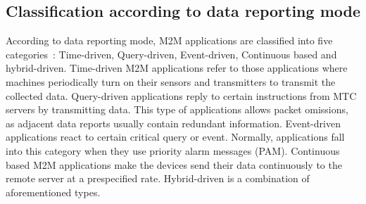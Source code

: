\subsection{Classification according to data reporting mode}
According to data reporting mode, M2M applications are classified into five categories~\cite{al2004routing}\cite{Costa14}\cite{borges2014survey}: Time-driven, Query-driven, Event-driven, Continuous based and hybrid-driven. Time-driven M2M applications refer to those applications where machines periodically turn on their sensors and transmitters to transmit the collected data. Query-driven applications reply to
certain instructions from MTC servers by transmitting data. This type of applications allows packet omissions, as adjacent data reports usually contain redundant information. Event-driven applications react to certain critical query or event. Normally, applications fall into this category when they use priority alarm messages (PAM). Continuous based M2M applications make the devices send their data continuously to the remote server at a prespecified rate. Hybrid-driven is a combination of aforementioned types.

